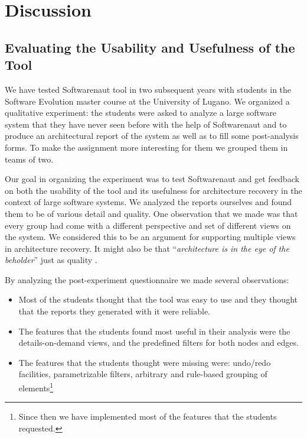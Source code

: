 \documentclass[preprint,12pt]{elsarticle}
\begin{document}



\newpage
\section {Discussion}
\label {sec:disc}

\subsection {Evaluating the Usability and Usefulness of the Tool}
We have tested Softwarenaut tool in two subsequent years with students in the Software Evolution master course at the University of Lugano. We organized a qualitative experiment: the students were asked to analyze a large software system that they have never seen before with the help of Softwarenaut and to produce an architectural report of the system as well as to fill some post-analysis forms. To make the assignment more interesting for them we grouped them in teams of two. 

Our goal in organizing the experiment was to test Softwarenaut and get feedback on both the usability of the tool and its usefulness for architecture recovery in the context of large software systems. We analyzed the reports ourselves and found them to be of various detail and quality. One observation that we made was that every group had come with a different perspective and set of different views on the system. We considered this to be an argument for supporting multiple views in architecture recovery. It might also be that ``{\em architecture is in the eye of the beholder}'' just as quality \cite{bass-architecture}.

By analyzing the post-experiment questionnaire we made several observations:

\begin{itemize}
\item Most of the students thought that the tool was easy to use and they thought that the reports they generated with it were reliable. 
\item The features that the students found most useful in their analysis were the details-on-demand views, and the predefined filters for both nodes and edges.
\item The features that the students thought were missing were: undo/redo facilities, parametrizable filters, arbitrary and rule-based grouping of elements\footnote{Since then we have implemented most of the features that the students requested.}
\end{itemize}
\end{document}
